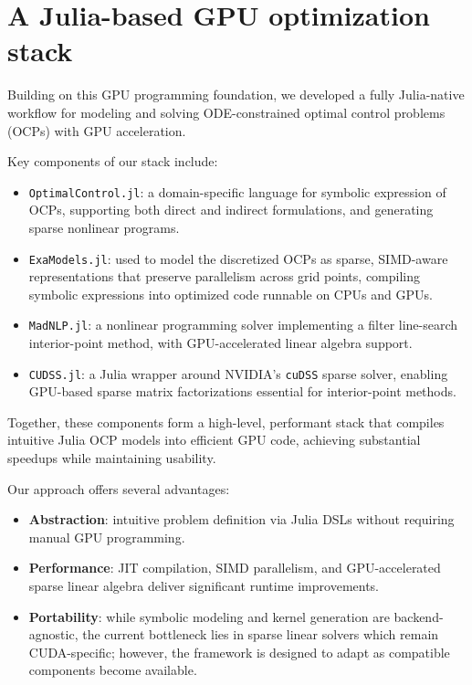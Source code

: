 \documentclass[twoside,leqno,twocolumn]{article}
\begin{document}
\section{A Julia-based GPU optimization stack}

Building on this GPU programming foundation, we developed a fully Julia-native workflow for modeling and solving ODE-constrained optimal control problems (OCPs) with GPU acceleration.

Key components of our stack include:

\begin{itemize}
    \item \texttt{OptimalControl.jl}: a domain-specific language for symbolic expression of OCPs, supporting both direct and indirect formulations, and generating sparse nonlinear programs.
    \item \texttt{ExaModels.jl}: used to model the discretized OCPs as sparse, 
    SIMD-aware representations that preserve parallelism across grid points, compiling symbolic expressions into optimized code runnable on CPUs and GPUs.
    \item \texttt{MadNLP.jl}: a nonlinear programming solver implementing a filter line-search interior-point method, with GPU-accelerated linear algebra support.
    \item \texttt{CUDSS.jl}: a Julia wrapper around NVIDIA’s \texttt{cuDSS} sparse solver, enabling GPU-based sparse matrix factorizations essential for interior-point methods.
\end{itemize}

Together, these components form a high-level, performant stack that compiles intuitive Julia OCP models into efficient GPU code, achieving substantial speedups while maintaining usability.

Our approach offers several advantages:

\begin{itemize}
    \item \textbf{Abstraction}: intuitive problem definition via Julia DSLs without requiring manual GPU programming.
    \item \textbf{Performance}: JIT compilation, SIMD parallelism, and GPU-accelerated sparse linear algebra deliver significant runtime improvements.
    \item \textbf{Portability}: while symbolic modeling and kernel generation are backend-agnostic, the current bottleneck lies in sparse linear solvers which remain CUDA-specific; however, the framework is designed to adapt as compatible components become available.
\end{itemize}
\end{document}
